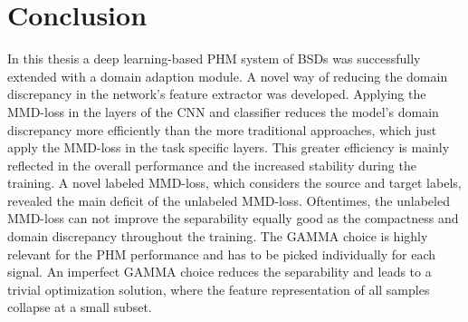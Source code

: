 \chapter{Conclusion}\label{chapter:conclusion}
In this thesis a deep learning-based PHM system of BSDs was successfully extended with a domain adaption module. A novel way of reducing the domain discrepancy in the network's feature extractor was developed. Applying the MMD-loss in the layers of the CNN and classifier reduces the model's domain discrepancy more efficiently than the more traditional approaches, which just apply the MMD-loss in the task specific layers. This greater efficiency is mainly reflected in the overall performance and the increased stability during the training. A novel labeled MMD-loss, which considers the source and target labels, revealed the main deficit of the unlabeled MMD-loss. Oftentimes, the unlabeled MMD-loss can not improve the separability equally good as the compactness and domain discrepancy throughout the training. The GAMMA choice is highly relevant for the PHM performance and has to be picked individually for each signal. An imperfect GAMMA choice reduces the separability and leads to a trivial optimization solution, where the feature representation of all samples collapse at a small subset. 
